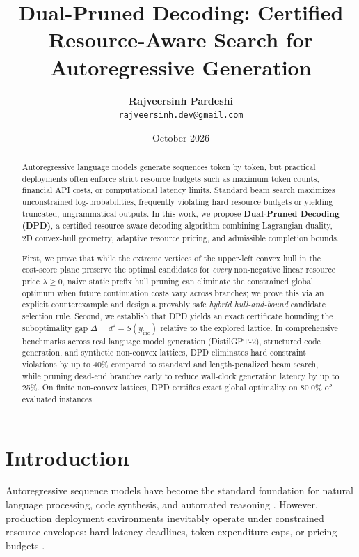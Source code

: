 \documentclass[11pt,a4paper]{article}
\title{\textbf{Dual-Pruned Decoding: Certified Resource-Aware Search for Autoregressive Generation}}
\author{\textbf{Rajveersinh Pardeshi} \\ \texttt{rajveersinh.dev@gmail.com}}
\date{October 2026}
\theoremstyle{plain}
\theoremstyle{definition}
\theoremstyle{remark}
\begin{document}
\maketitle

\begin{abstract}
Autoregressive language models generate sequences token by token, but practical deployments often enforce strict resource budgets such as maximum token counts, financial API costs, or computational latency limits. Standard beam search maximizes unconstrained log-probabilities, frequently violating hard resource budgets or yielding truncated, ungrammatical outputs. In this work, we propose \textbf{Dual-Pruned Decoding (DPD)}, a certified resource-aware decoding algorithm combining Lagrangian duality, 2D convex-hull geometry, adaptive resource pricing, and admissible completion bounds. 

First, we prove that while the extreme vertices of the upper-left convex hull in the cost-score plane preserve the optimal candidates for \emph{every} non-negative linear resource price $\lambda \ge 0$, naive static prefix hull pruning can eliminate the constrained global optimum when future continuation costs vary across branches; we prove this via an explicit counterexample and design a provably safe \emph{hybrid hull-and-bound} candidate selection rule. Second, we establish that DPD yields an exact certificate bounding the suboptimality gap $\Delta = d^\star - S(y_{\text{inc}})$ relative to the explored lattice. In comprehensive benchmarks across real language model generation (DistilGPT-2), structured code generation, and synthetic non-convex lattices, DPD eliminates hard constraint violations by up to 40\% compared to standard and length-penalized beam search, while pruning dead-end branches early to reduce wall-clock generation latency by up to 25\%. On finite non-convex lattices, DPD certifies exact global optimality on 80.0\% of evaluated instances.
\end{abstract}

\section{Introduction}
Autoregressive sequence models have become the standard foundation for natural language processing, code synthesis, and automated reasoning \citep{wu2016google, meister2020best}. However, production deployment environments inevitably operate under constrained resource envelopes: hard latency deadlines, token expenditure caps, or pricing budgets \citep{lu2021neurologic, lu2022neurologic}.
\end{document}
